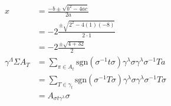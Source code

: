 \documentclass{article}
\begin{document}
\begin{align*}
    x &= \frac{-b\pm\sqrt{b^2-4ac}}{2a} \\
    &= -2\frac{\pm\sqrt{2^2-4(1)(-8)}}{2\cdot1} \\
    &= -2\frac{\pm\sqrt{4+32}}{2} \\
    \gamma^\Lambda\Sigma A_T &= \sum_{\pi\in A_t} \text{sgn}(\sigma^{-1}t\sigma) \gamma^{\lambda}\sigma\gamma^{\lambda}\sigma^{-1}Ta \\
    &= \sum_{T\in\gamma_t}\text{sgn}(\sigma^{-1}T\sigma) \gamma^{\lambda}\sigma\gamma^{\lambda}\sigma^{-1}T\sigma \\
    &= A_{\sigma t\gamma^{\lambda}}\sigma
\end{align*}
\end{document}
